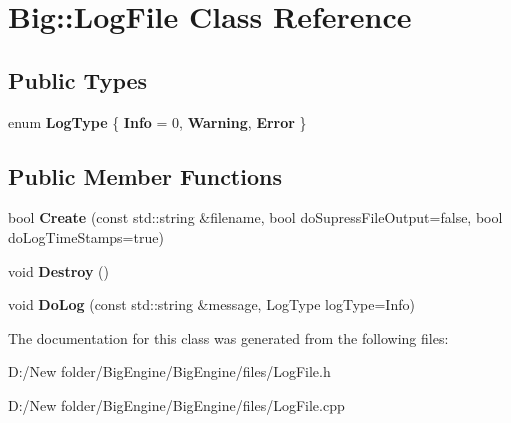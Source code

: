 \hypertarget{class_big_1_1_log_file}{}\section{Big\+:\+:Log\+File Class Reference}
\label{class_big_1_1_log_file}
\subsection*{Public Types}
\begin{DoxyCompactItemize}
\item 
\mbox{\label{class_big_1_1_log_file_af8cbeffaa607727e2ec233c98a30c500}} 
enum {\bfseries Log\+Type} \{ {\bfseries Info} = 0, 
{\bfseries Warning}, 
{\bfseries Error}
 \}
\end{DoxyCompactItemize}
\subsection*{Public Member Functions}
\begin{DoxyCompactItemize}
\item 
\mbox{\label{class_big_1_1_log_file_a56cd2801a553cf2a938861890b5d1ee1}} 
bool {\bfseries Create} (const std\+::string \&filename, bool do\+Supress\+File\+Output=false, bool do\+Log\+Time\+Stamps=true)
\item 
\mbox{\label{class_big_1_1_log_file_ac1af600d6c718ccef248918790d50a5e}} 
void {\bfseries Destroy} ()
\item 
\mbox{\label{class_big_1_1_log_file_adc624c9d749b1139ef8afba489d1cd8e}} 
void {\bfseries Do\+Log} (const std\+::string \&message, Log\+Type log\+Type=Info)
\end{DoxyCompactItemize}


The documentation for this class was generated from the following files\+:\begin{DoxyCompactItemize}
\item 
D\+:/\+New folder/\+Big\+Engine/\+Big\+Engine/files/Log\+File.\+h\item 
D\+:/\+New folder/\+Big\+Engine/\+Big\+Engine/files/Log\+File.\+cpp\end{DoxyCompactItemize}
